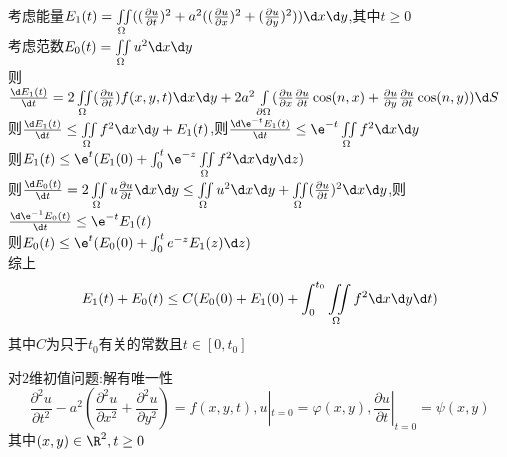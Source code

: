 \begin{jie}
考虑能量$E_1(t)=\iint\limits_{\Omega}((\frac{\partial u}{\partial t})^2+a^2((\frac{\partial u}{\partial x})^2+(\frac{\partial u}{\partial y})^2))\d x\d y$,其中$t\geq 0$\\
考虑范数$E_0(t)=\iint\limits_{\Omega}u^2\d x\d y$\\
则$\frac{\d E_1(t)}{\d t}=2\iint\limits_{\Omega}(\frac{\partial u}{\partial t})f(x,y,t)\d x\d y+2a^2\int\limits_{\partial\Omega}(\frac{\partial u}{\partial x}\frac{\partial u}{\partial t}\cos(n,x)+\frac{\partial u}{\partial y}\frac{\partial u}{\partial t}\cos(n,y))\d S$\\
则$\frac{\d E_1(t)}{\d t}\leq \iint\limits_{\Omega}f^2\d x\d y+E_1(t)$,则$\frac{\d \e^{-t}E_1(t)}{\d t}\leq \e^{-t}\iint\limits_{\Omega}f^2\d x\d y$\\
则$E_1(t)\leq \e^{t}(E_1(0)+\int_{0}^{t}\e^{-z}\iint\limits_{\Omega}f^2\d x\d y\d z)$\\
则$\frac{\d E_0(t)}{\d t}=2\iint\limits_{\Omega}u\frac{\partial u}{\partial t}\d x\d y\leq\iint\limits_{\Omega}u^2\d x\d y+\iint\limits_{\Omega}(\frac{\partial u}{\partial t})^2\d x\d y$,则$\frac{\d \e^{-1}E_0(t)}{\d t}\leq \e^{-t}E_1(t)$\\
则$E_0(t)\leq \e^{t}(E_0(0)+\int_{0}^{t}e^{-z}E_1(z)\d z)$\\
综上\[E_1(t)+E_0(t)\leq C(E_0(0)+E_1(0)+\int_{0}^{t_0}\iint\limits_{\Omega}f^2\d x\d y\d t)\]
其中$C$为只于$t_0$有关的常数且$t\in[0,t_0]$
\end{jie}

\begin{dingli*}
对$2$维初值问题:解有唯一性
\[\frac{\partial^2 u}{\partial t^2}-a^2(\frac{\partial^2 u}{\partial x^2}+\frac{\partial^2 u}{\partial y^2})=f(x,y,t),u|_{t=0}=\varphi(x,y),\frac{\partial u}{\partial t}|_{t=0}=\psi(x,y)\]
其中$(x,y)\in\R^2,t\geq 0$
\end{dingli*}

